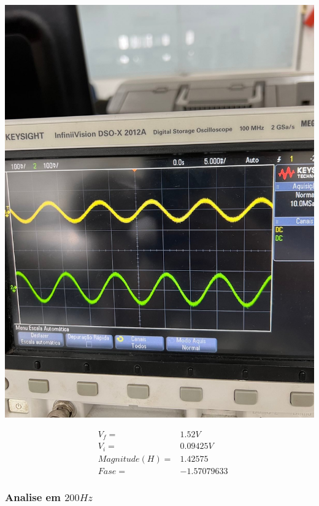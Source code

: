 \documentclass[12pt,twoside, a4paper, twocolumn]{article}
\begin{document}
\begin{adjustbox}{scale=0.18}
    \includegraphics{freq100.jpeg}
\end{adjustbox}

\begin{equation*}
    \begin{aligned}
         & V_f =          & 1.52V       \\
         & V_i =          & 0.09425V    \\
         & Magnitude(H) = & 1.42575     \\
         & Fase =         & -1.57079633
    \end{aligned}
\end{equation*}

\subsubsection{Analise em $200Hz$}
\subparagraph*{}
\end{document}
